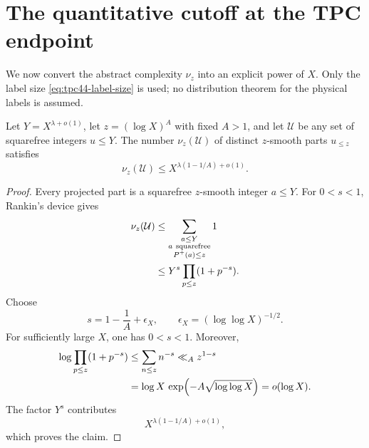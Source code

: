 \section{The quantitative cutoff at the TPC endpoint}
\label{sec:tpc44-quantitative-cutoff}

We now convert the abstract complexity \(\nu_z\) into an explicit
power of \(X\).  Only the label size \eqref{eq:tpc44-label-size} is used;
no distribution theorem for the physical labels is assumed.

\begin{lemma}
\label{lem:tpc44-Rankin-projection}
Let \(Y=X^{\lambda+o(1)}\), let \(z=(\log X)^A\) with fixed \(A>1\), and
let \(\mathcal U\) be any set of squarefree integers \(u\le Y\).  The
number \(\nu_z(\mathcal U)\) of distinct \(z\)-smooth parts \(u_{\le z}\)
satisfies
\begin{equation}
 \nu_z(\mathcal U)
 \le X^{\lambda(1-1/A)+o(1)}.
 \label{eq:tpc44-general-Rankin-bound}
\end{equation}
\end{lemma}

\begin{proof}
Every projected part is a squarefree \(z\)-smooth integer \(a\le Y\).
For \(0<s<1\), Rankin's device gives
\begin{align}
 \nu_z(\mathcal U)
 &\le\sum_{\substack{a\le Y\\a\ \text{squarefree}\\P^{+}(a)\le z}}1
 \notag\\
 &\le Y^s\prod_{p\le z}(1+p^{-s}).
 \label{eq:tpc44-Rankin-product}
\end{align}
Choose
\begin{equation}
 s=1-\frac1A+\epsilon_X,
 \qquad
 \epsilon_X=(\log\log X)^{-1/2}.
 \label{eq:tpc44-Rankin-s}
\end{equation}
For sufficiently large \(X\), one has \(0<s<1\).  Moreover,
\begin{align}
 \log\prod_{p\le z}(1+p^{-s})
 &\le\sum_{n\le z}n^{-s}
 \ll_A z^{1-s}
 \notag\\
 &=\log X\,
   \exp\!\left(-A\sqrt{\log\log X}\right)
 =o(\log X).
 \label{eq:tpc44-Euler-product-small}
\end{align}
The factor \(Y^s\) contributes
\begin{equation}
 X^{\lambda(1-1/A)+o(1)},
 \label{eq:tpc44-Rankin-main-factor}
\end{equation}
which proves the claim.
\end{proof}

